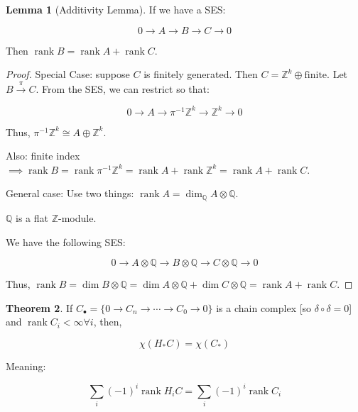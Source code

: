 \documentclass{article}
\theoremstyle{definition}
\newtheorem{theorem}{Theorem}
\newtheorem{lemma}[theorem]{Lemma}
\begin{document}
    \begin{lemma}
        [Additivity Lemma] If we have a SES:

        \[
            0 \to A \to B \to C \to 0
        \]

        Then \(\operatorname{rank} B = \operatorname{rank} A + \operatorname{rank} C\).
    \end{lemma}

    \begin{proof}
        Special Case: suppose \(C\) is finitely generated. Then \(C = \mathbb{Z}^k \oplus \text{finite}\). Let \(B \xrightarrow{\pi} C\). From the SES, we can restrict so that:

        \[
            0 \to A \to \pi ^{-1} \mathbb{Z}^k \to \mathbb{Z}^k \to 0
        \]

        Thus, \(\pi ^{-1} \mathbb{Z}^k \cong A \oplus \mathbb{Z}^k\).

        Also: finite index \(\implies \operatorname{rank} B = \operatorname{rank} \pi ^{-1} \mathbb{Z}^k = \operatorname{rank} A + \operatorname{rank} \mathbb{Z}^k = \operatorname{rank} A + \operatorname{rank} C\).

        General case: Use two things: \(\operatorname{rank} A = \dim_{\mathbb{Q}} A \otimes \mathbb{Q}\).

        \(\mathbb{Q}\) is a flat \(\mathbb{Z}\)-module.

        We have the following SES:

        \[
            0 \to A \otimes \mathbb{Q} \to B \otimes \mathbb{Q} \to C \otimes \mathbb{Q} \to 0
        \]

        Thus, \(\operatorname{rank} B = \dim B \otimes \mathbb{Q} = \dim A \otimes \mathbb{Q} + \dim C \otimes \mathbb{Q} = \operatorname{rank} A + \operatorname{rank} C\).
    \end{proof}

    \begin{theorem}
        If \(C_\bullet = \{ 0 \to C_n \to \cdots \to C_0 \to 0 \}\) is a chain complex [so \(\delta \circ \delta = 0\)] and \(\operatorname{rank} C_i < \infty \forall i\), then,

        \[
            \chi(H_{\ast} C) = \chi(C_{\ast})
        \]
    \end{theorem}

    Meaning:

    \[
        \sum_{i} (-1)^i \operatorname{rank} H_i C = \sum_{i} (-1)^i \operatorname{rank} C_i
    \]
\end{document}
